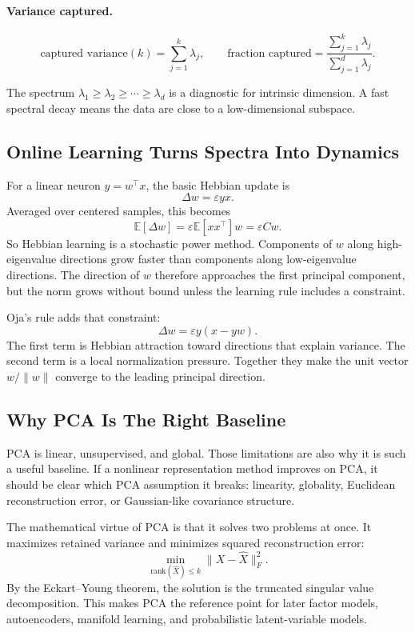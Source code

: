 \paragraph{Variance captured.}
\[
  \text{captured variance}(k)
  =
  \sum_{j=1}^{k}\lambda_j,
  \qquad
  \text{fraction captured}
  =
  \frac{\sum_{j=1}^{k}\lambda_j}{\sum_{j=1}^{d}\lambda_j}.
\]

The spectrum \(\lambda_1\ge \lambda_2\ge \cdots\ge \lambda_d\) is a diagnostic for intrinsic dimension. A fast spectral decay means the data are close to a low-dimensional subspace.

\subsection{Online Learning Turns Spectra Into Dynamics}

For a linear neuron \(y=w^\top x\), the basic Hebbian update is
\[
  \Delta w = \varepsilon yx.
\]
Averaged over centered samples, this becomes
\[
  \mathbb{E}[\Delta w]
  =
  \varepsilon \mathbb{E}[xx^\top]w
  =
  \varepsilon Cw.
\]
So Hebbian learning is a stochastic power method. Components of \(w\) along high-eigenvalue directions grow faster than components along low-eigenvalue directions. The direction of \(w\) therefore approaches the first principal component, but the norm grows without bound unless the learning rule includes a constraint.

Oja's rule adds that constraint:
\[
  \Delta w
  =
  \varepsilon y(x-yw).
\]
The first term is Hebbian attraction toward directions that explain variance. The second term is a local normalization pressure. Together they make the unit vector \(w/\|w\|\) converge to the leading principal direction.

\subsection{Why PCA Is The Right Baseline}

PCA is linear, unsupervised, and global. Those limitations are also why it is such a useful baseline. If a nonlinear representation method improves on PCA, it should be clear which PCA assumption it breaks: linearity, globality, Euclidean reconstruction error, or Gaussian-like covariance structure.

The mathematical virtue of PCA is that it solves two problems at once. It maximizes retained variance and minimizes squared reconstruction error:
\[
  \min_{\mathrm{rank}(\hat{X})\le k}
  \|X-\hat{X}\|_F^2.
\]
By the Eckart--Young theorem, the solution is the truncated singular value decomposition. This makes PCA the reference point for later factor models, autoencoders, manifold learning, and probabilistic latent-variable models.
